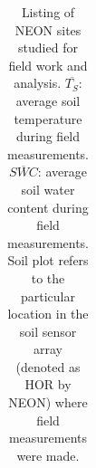 \documentclass[
  letterpaper,
  DIV=11,
  numbers=noendperiod]{scrartcl}
\begin{document}
\begin{longtable}[]{@{}
  >{\raggedright\arraybackslash}p{}
  >{\raggedright\arraybackslash}p{}
  >{\raggedright\arraybackslash}p{}
  >{\raggedright\arraybackslash}p{}
  >{\raggedright\arraybackslash}p{}
  >{\raggedright\arraybackslash}p{}
  >{\raggedright\arraybackslash}p{}
  >{\raggedright\arraybackslash}p{}
  >{\raggedright\arraybackslash}p{}@{}}

\caption{\label{tbl-neon-sites}Listing of NEON sites studied for field
work and analysis. \(\overline{T_{S}}\): average soil temperature during
field measurements. \(\overline{SWC}\): average soil water content
during field measurements. Soil plot refers to the particular location
in the soil sensor array (denoted as HOR by NEON) where field
measurements were made.}

\tabularnewline


\end{longtable}
\end{document}
